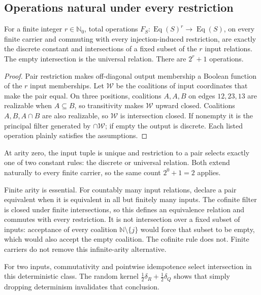 \subsection{Operations natural under every restriction}
\label{pat:naturality}
\begin{theorem}
For a finite integer $r\in\mathbb N_0$, total operations $F_S:\operatorname{Eq}(S)^r\to\operatorname{Eq}(S)$, on every finite carrier and commuting with every injection-induced restriction, are exactly the discrete constant and intersections of a fixed subset of the $r$ input relations. The empty intersection is the universal relation. There are $2^r+1$ operations.
\end{theorem}
\begin{proof}
Pair restriction makes off-diagonal output membership a Boolean function of the $r$ input memberships. Let $\mathcal W$ be the coalitions of input coordinates that make the pair equal. On three positions, coalitions $A,A,B$ on edges $12,23,13$ are realizable when $A\subseteq B$, so transitivity makes $\mathcal W$ upward closed. Coalitions $A,B,A\cap B$ are also realizable, so $\mathcal W$ is intersection closed. If nonempty it is the principal filter generated by $\cap\mathcal W$; if empty the output is discrete. Each listed operation plainly satisfies the assumptions.
\end{proof}
At arity zero, the input tuple is unique and restriction to a pair selects exactly one of two constant rules: the discrete or universal relation. Both extend naturally to every finite carrier, so the same count $2^0+1=2$ applies.

Finite arity is essential. For countably many input relations, declare a pair equivalent when it is equivalent in all but finitely many inputs. The cofinite filter is closed under finite intersections, so this defines an equivalence relation and commutes with every restriction. It is not intersection over a fixed subset of inputs: acceptance of every coalition $\mathbb N\setminus\{j\}$ would force that subset to be empty, which would also accept the empty coalition. The cofinite rule does not. Finite carriers do not remove this infinite-arity alternative.

For two inputs, commutativity and pointwise idempotence select intersection in this deterministic class. The random kernel $\tfrac12\delta_R+\tfrac12\delta_Q$ shows that simply dropping determinism invalidates that conclusion.


